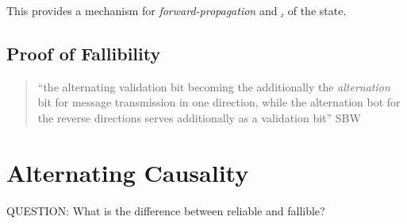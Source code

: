 \documentclass[../../../OAE-SPEC-MAIN.tex]{subfiles}
\begin{document}
This provides a mechanism  for \emph{forward-propagation} and \href{back-propagation}, of the state.

\subsection{Proof of Fallibility}

\begin{quotation}
``the alternating validation bit becoming the additionally the \emph{alternation} bit for message transmission in one direction, while the alternation bot for the reverse directions serves additionally  as a validation bit'' SBW \cite{SBW}
\end{quotation}




\section{Alternating Causality}

QUESTION: What is the difference between reliable and fallible?



%
%
%

\end{document}
